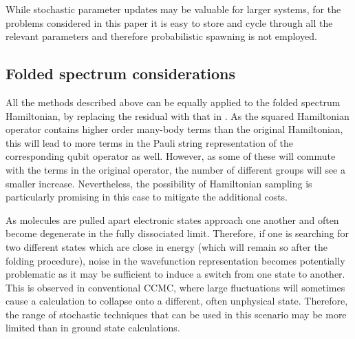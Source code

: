 \documentclass[%
 reprint,
 amsmath,amssymb,
 aps,
]{revtex4-2}
\begin{document}
While stochastic parameter updates may be valuable for larger systems, for the problems considered in this paper it is easy to store and cycle through all the relevant parameters and therefore probabilistic spawning is not employed.

\subsection{Folded spectrum considerations}
All the methods described above can be equally applied to the folded spectrum Hamiltonian, by replacing the residual with that in . As the squared Hamiltonian operator contains higher order many-body terms than the original Hamiltonian, this will lead to more terms in the Pauli string representation of the corresponding qubit operator as well. However, as some of these will commute with the terms in the original operator, the number of different groups will see a smaller increase. 
Nevertheless, the possibility of Hamiltonian sampling is particularly promising in this case to mitigate the additional costs.

As molecules are pulled apart electronic states approach one another and often become degenerate in the fully dissociated limit. Therefore, if one is searching for two different states which are close in energy (which will remain so after the folding procedure), noise in the wavefunction representation becomes potentially problematic as it may be sufficient to induce a switch from one state to another. This is observed in conventional CCMC, where large fluctuations will sometimes cause a calculation to collapse onto a different, often unphysical state.\cite{Scott2019,Scott2020} Therefore, the range of stochastic techniques that can be used in this scenario may be more limited than in ground state calculations.
\end{document}
